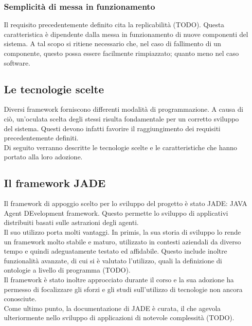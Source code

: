 \subsubsection{Semplicità di messa in funzionamento}
Il requisito precedentemente definito cita la replicabilità (TODO). Questa caratteristica è dipendente dalla messa in funzionamento di nuove componenti del sistema. A tal scopo si ritiene necessario che, nel caso di fallimento di un componente, questo possa essere facilmente rimpiazzato; quanto meno nel caso software.

\subsection{Le tecnologie scelte}
Diversi framework forniscono differenti modalità di programmazione. A causa di ciò, un'oculata scelta degli stessi risulta fondamentale per un corretto sviluppo del sistema. Questi devono infatti favorire il raggiungimento dei requisiti precedentemente definiti.\\
Di seguito verranno descritte le tecnologie scelte e le caratteristiche che hanno portato alla loro adozione.

\subsection{Il framework JADE}
Il framework di appoggio scelto per lo sviluppo del progetto è stato JADE: JAVA Agent DEvelopment framework. Questo permette lo sviluppo di applicativi distribuiti basati sulle astrazioni degli agenti.\\
Il suo utilizzo porta molti vantaggi. In primis, la sua storia di sviluppo lo rende un framework molto stabile e maturo, utilizzato in contesti aziendali da diverso tempo e quindi adeguatamente testato ed affidabile. Questo include inoltre funzionalità avanzate, di cui si è valutato l'utilizzo, quali la definizione di ontologie a livello di programma (TODO).\\
Il framework è stato inoltre approcciato durante il corso e la sua adozione ha permesso di focalizzare gli sforzi e gli studi sull'utilizzo di tecnologie non ancora conosciute.\\
Come ultimo punto, la documentazione di JADE è curata, il che agevola ulteriormente nello sviluppo di applicazioni di notevole complessità (TODO).


